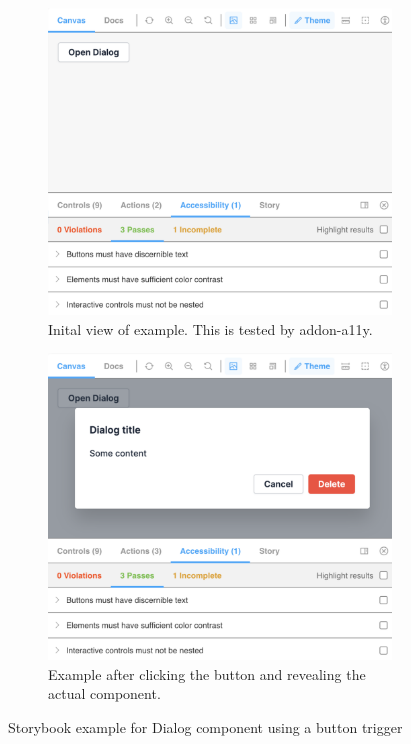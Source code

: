 \documentclass{master_thesis}
\begin{document}
\begin{figure}[ht]
	\begin{subfigure}{0.45\textwidth}
	\includegraphics[width=\textwidth]{img/sb-button-trigger.png}
	\caption{Inital view of example. This is tested by addon-a11y.}
	\label{fig:sb-button-trigger-1}
	\end{subfigure}
	\hspace{0.05\textwidth}
	\begin{subfigure}{0.45\textwidth}
	\includegraphics[width=\textwidth]{img/sb-button-trigger-open.png}
	\caption{Example after clicking the button and revealing the actual component.}
	\label{fig:sb-button-trigger-2}
	\end{subfigure}
\caption{Storybook example for Dialog component using a button trigger}
\label{fig:sb-button-trigger}
\end{figure}
\end{document}
